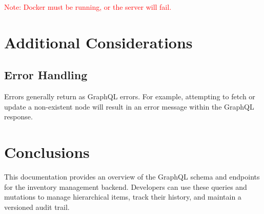 \documentclass[12pt,a4paper]{article}
\begin{document}
\small\textcolor{red}{Note: Docker must be running, or the server will fail.}
\section{Additional Considerations}

\subsection{Error Handling}
Errors generally return as GraphQL errors. For example, attempting to fetch or update a non-existent node will result in an error message within the GraphQL response.


\section{Conclusions}
This documentation provides an overview of the GraphQL schema and endpoints for the inventory management backend. Developers can use these queries and mutations to manage hierarchical items, track their history, and maintain a versioned audit trail.
\end{document}
